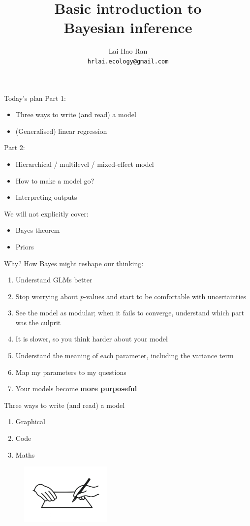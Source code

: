 \documentclass[12pt]{beamer}
\author{Lai Hao Ran \\ \footnotesize\texttt{hrlai.ecology@gmail.com}}
\title{Basic introduction to\\Bayesian inference}
\date{}
\begin{document}
\begin{frame}
\titlepage
\end{frame}

\begin{frame}{Today's plan}
Part 1:
\begin{itemize}
\item Three ways to write (and read) a model
\item (Generalised) linear regression
\end{itemize}

Part 2:
\begin{itemize}
\item Hierarchical / multilevel / mixed-effect model
\item How to make a model go?
\item Interpreting outputs
\end{itemize}
\vfill
We will not explicitly cover:
\begin{itemize}
\item Bayes theorem 
\item Priors
\end{itemize}
\end{frame}

\begin{frame}{Why?}
How Bayes might reshape our thinking:
\begin{enumerate}
\item Understand GLMs better
\item Stop worrying about $p$-values and start to be comfortable with uncertainties
\item See the model as modular; when it fails to converge, understand which part was the culprit
\item It is slower, so you think harder about your model
\item Understand the meaning of each parameter, including the variance term
\item Map my parameters to my questions
\item Your models become \textbf{more purposeful}
\end{enumerate}
\end{frame}

\begin{frame}{Three ways to write (and read) a model}
\begin{enumerate}
\item Graphical
\item Code
\item Maths
\end{enumerate}
\begin{figure}
\centering
\includegraphics[width=0.4\textwidth]{fig/exercise.png}
\end{figure}
\end{frame}
\end{document}

